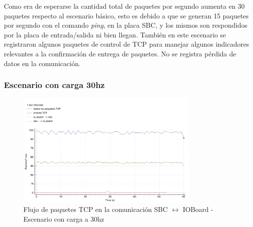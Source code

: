 \documentclass[withindex,glossary]{cam-thesis}
\begin{document}
Como era de esperarse la cantidad total de paquetes por segundo aumenta en 30 paquetes respecto al escenario básico, esto es debido a que se generan 15 paquetes por segundo con el comando \textit{ping}, en la placa SBC, y los mismos son respondidos por la placa de entrada/salida ni bien llegan.
También en este escenario se registraron algunos paquetes de control de TCP para manejar algunos indicadores relevantes a la confirmación de entrega de paquetes. No se registra pérdida de datos en la comunicación.


\subsubsection{Escenario con carga 30hz}
\begin{figure}[H]
  \centering
  	\includegraphics[width=0.8\textwidth]{images/TCP_Throughput_io_to_pc_30hz_pps}
  	\caption[Throughput de la conexión TCP - Escenario con carga a 30hz]{Flujo de paquetes TCP en la comunicación SBC $\leftrightarrow$ IOBoard -  Escenario con carga a 30hz}
  \label{fig:TCP_Throughput_io_to_pc_30hz_pps}
\end{figure}
\end{document}
